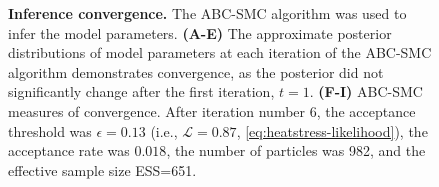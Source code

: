 \documentclass[12pt]{extarticle}
\newcommand{\likelihood}{\mathcal{L}}
\begin{document}
\begin{figure}[h]
\begin{subfigure}{1\textwidth}
     \label{fig:convergence-B}
  \end{subfigure}
    \caption{
    \textbf{Inference convergence.} 
    The ABC-SMC algorithm was used to infer the model parameters. \textbf{(A-E)} The approximate posterior distributions of model parameters at each iteration of the ABC-SMC algorithm demonstrates convergence, as the posterior did not significantly change after the first iteration, $t=1$.
    \textbf{(F-I)} ABC-SMC measures of convergence. After iteration number 6, the acceptance threshold was $\epsilon=0.13$ (i.e., $\likelihood=0.87$, \cref{eq:heatstress-likelihood}), the acceptance rate was $0.018$, the number of particles was 982, and the effective sample size ESS=651.
}
    \label{fig:convergence}
\end{figure}


\end{document}

